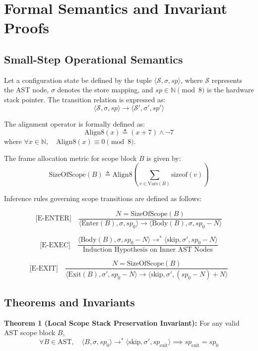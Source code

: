 \documentclass[conference]{IEEEtran}
\begin{document}
\section{Formal Semantics and Invariant Proofs}

\subsection{Small-Step Operational Semantics}
Let a configuration state be defined by the tuple $\langle \mathcal{S}, \sigma, sp \rangle$, where $\mathcal{S}$ represents the AST node, $\sigma$ denotes the store mapping, and $sp \in \mathbb{N} \pmod 8$ is the hardware stack pointer. The transition relation is expressed as:
\[\langle \mathcal{S}, \sigma, sp \rangle \longrightarrow \langle \mathcal{S}', \sigma', sp' \rangle\]

The alignment operator is formally defined as:
\[\mathrm{Align8}(x) \triangleq (x + 7) \land \neg 7\]
where $\forall x \in \mathbb{N}, \quad \mathrm{Align8}(x) \equiv 0 \pmod 8$.

The frame allocation metric for scope block $B$ is given by:
\[\mathrm{SizeOfScope}(B) \triangleq \mathrm{Align8}\left( \sum_{v \in \mathrm{Vars}(B)} \mathrm{sizeof}(v) \right)\]

Inference rules governing scope transitions are defined as follows:

\[\text{[E-ENTER]} \quad \frac{N = \mathrm{SizeOfScope}(B)}{\langle \mathrm{Enter}(B), \sigma, sp_0 \rangle \longrightarrow \langle \mathrm{Body}(B), \sigma, sp_0 - N \rangle}\]

\[\text{[E-EXEC]} \quad \frac{\langle \mathrm{Body}(B), \sigma, sp_0 - N \rangle \longrightarrow^* \langle \text{skip}, \sigma', sp_0 - N \rangle}{\text{Induction Hypothesis on Inner AST Nodes}}\]

\[\text{[E-EXIT]} \quad \frac{N = \mathrm{SizeOfScope}(B)}{\langle \mathrm{Exit}(B), \sigma', sp_0 - N \rangle \longrightarrow \langle \text{skip}, \sigma', (sp_0 - N) + N \rangle}\]

\subsection{Theorems and Invariants}

\textbf{Theorem 1 (Local Scope Stack Preservation Invariant):} 
For any valid AST scope block $B$,
\[\forall B \in \text{AST}, \quad \langle B, \sigma, sp_0 \rangle \longrightarrow^* \langle \text{skip}, \sigma', sp_{\text{exit}} \rangle \implies sp_{\text{exit}} = sp_0\]
\end{document}
